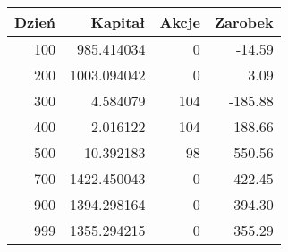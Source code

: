 \begin{tabular}{rrrr}
\toprule
 Dzień &     Kapitał &  Akcje &  Zarobek \\
\midrule
   100 &  985.414034 &      0 &   -14.59 \\
   200 & 1003.094042 &      0 &     3.09 \\
   300 &    4.584079 &    104 &  -185.88 \\
   400 &    2.016122 &    104 &   188.66 \\
   500 &   10.392183 &     98 &   550.56 \\
   700 & 1422.450043 &      0 &   422.45 \\
   900 & 1394.298164 &      0 &   394.30 \\
   999 & 1355.294215 &      0 &   355.29 \\
\bottomrule
\end{tabular}

